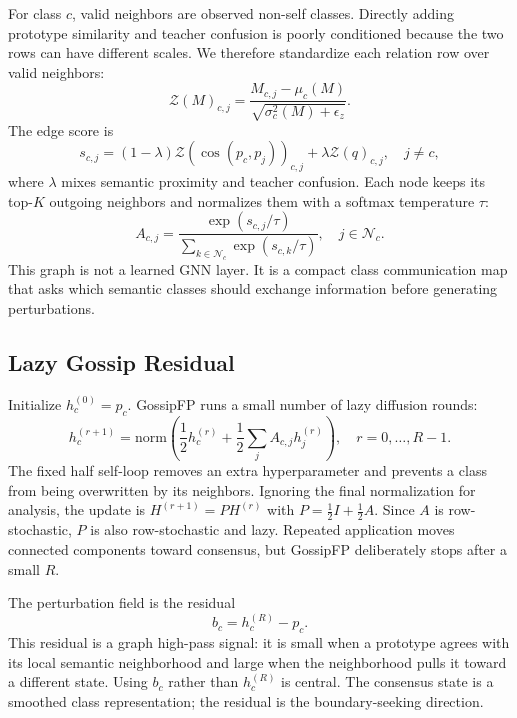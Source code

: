\documentclass[10pt,twocolumn,letterpaper]{article}
\begin{document}
For class $c$, valid neighbors are observed non-self classes. Directly adding prototype similarity and teacher confusion is poorly conditioned because the two rows can have different scales. We therefore standardize each relation row over valid neighbors:
\begin{equation}
    \mathcal{Z}(M)_{c,j}
    =
    \frac{M_{c,j}-\mu_c(M)}
    {\sqrt{\sigma_c^2(M)+\epsilon_z}}.
\end{equation}
The edge score is
\begin{equation}
    s_{c,j}
    =
    (1-\lambda)\mathcal{Z}(\cos(p_c,p_j))_{c,j}
    +
    \lambda \mathcal{Z}(q)_{c,j},
    \quad j \ne c,
\end{equation}
where $\lambda$ mixes semantic proximity and teacher confusion. Each node keeps its top-$K$ outgoing neighbors and normalizes them with a softmax temperature $\tau$:
\begin{equation}
    A_{c,j} =
    \frac{\exp(s_{c,j}/\tau)}
    {\sum_{k \in \mathcal{N}_c}\exp(s_{c,k}/\tau)},
    \quad j\in\mathcal{N}_c.
\end{equation}
This graph is not a learned GNN layer. It is a compact class communication map that asks which semantic classes should exchange information before generating perturbations.

\subsection{Lazy Gossip Residual}

Initialize $h_c^{(0)}=p_c$. GossipFP runs a small number of lazy diffusion rounds:
\begin{equation}
    h_c^{(r+1)}
    =
    \mathrm{norm}
    \left(
    \frac{1}{2}h_c^{(r)}
    +
    \frac{1}{2}\sum_j A_{c,j}h_j^{(r)}
    \right),
    \quad r=0,\ldots,R-1.
\end{equation}
The fixed half self-loop removes an extra hyperparameter and prevents a class from being overwritten by its neighbors. Ignoring the final normalization for analysis, the update is $H^{(r+1)}=PH^{(r)}$ with $P=\frac{1}{2}I+\frac{1}{2}A$. Since $A$ is row-stochastic, $P$ is also row-stochastic and lazy. Repeated application moves connected components toward consensus, but GossipFP deliberately stops after a small $R$.

The perturbation field is the residual
\begin{equation}
    b_c = h_c^{(R)} - p_c.
\end{equation}
This residual is a graph high-pass signal: it is small when a prototype agrees with its local semantic neighborhood and large when the neighborhood pulls it toward a different state. Using $b_c$ rather than $h_c^{(R)}$ is central. The consensus state is a smoothed class representation; the residual is the boundary-seeking direction.
\end{document}
